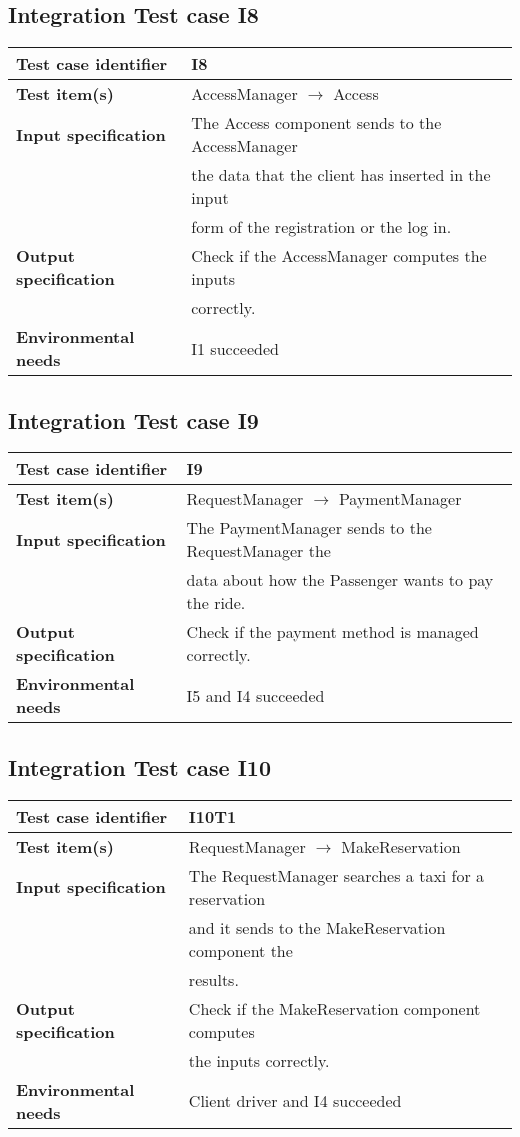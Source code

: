 	\subsection{Integration Test case I8}
		\begin{tabular}{ l l}
			\hline 		\textbf{Test case identifier} & I8 \\
			\hline		\textbf{Test item(s)}  & AccessManager $\rightarrow$ Access \\
			\hline		\textbf{Input specification} & The Access component sends to the AccessManager \\ & the data that the client has inserted in the input \\ & form of the registration or the log in.\\
			\hline		\textbf{Output specification} & Check if the AccessManager computes the inputs\\ & correctly.\\
			\hline		\textbf{Environmental needs} & I1 succeeded\\
			\hline
		\end{tabular}
	\subsection{Integration Test case I9}
		\begin{tabular}{ l l}
			\hline 		\textbf{Test case identifier} & I9 \\
			\hline		\textbf{Test item(s)}  & RequestManager $\rightarrow$ PaymentManager \\
			\hline		\textbf{Input specification} & The PaymentManager sends to the RequestManager the\\ & data about how the Passenger wants to pay the ride.\\
			\hline		\textbf{Output specification} & Check if the payment method is managed correctly.\\
			\hline		\textbf{Environmental needs} & I5 and I4 succeeded\\
			\hline
		\end{tabular}
	\subsection{Integration Test case I10}
		\begin{tabular}{ l l}
			\hline 		\textbf{Test case identifier} & I10T1 \\
			\hline		\textbf{Test item(s)}  & RequestManager $\rightarrow$ MakeReservation \\
			\hline		\textbf{Input specification} & The RequestManager searches a taxi for a reservation\\ & and it sends to the MakeReservation component the\\ & results.\\
			\hline		\textbf{Output specification} & Check if the MakeReservation component computes \\ & the inputs correctly.\\
			\hline		\textbf{Environmental needs} & Client driver and I4 succeeded\\
			\hline
		\end{tabular}
		
